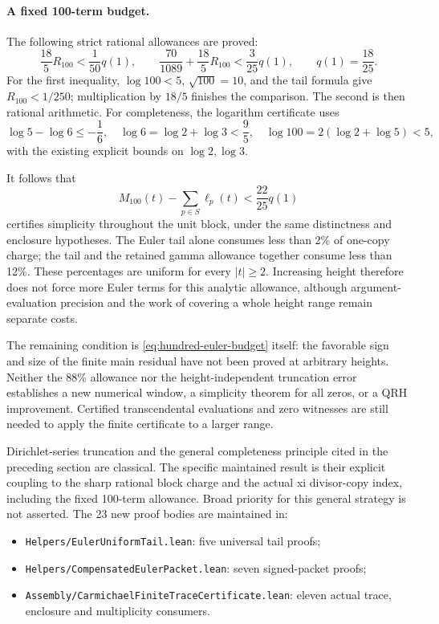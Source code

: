 \paragraph{A fixed 100-term budget.}
The following strict rational allowances are proved:
\[
 \frac{18}{5}R_{100}<\frac1{50}q(1),\qquad
 \frac{70}{1089}+\frac{18}{5}R_{100}<\frac3{25}q(1),
 \qquad q(1)=\frac{18}{25}.
\]
For the first inequality, \(\log100<5\), \(\sqrt{100}=10\), and the
tail formula give \(R_{100}<1/250\); multiplication by \(18/5\)
finishes the comparison.  The second is then rational arithmetic.
For completeness, the logarithm certificate uses
\[
 \log5-\log6\le-\frac16,\quad
 \log6=\log2+\log3<\frac95,\quad
 \log100=2(\log2+\log5)<5,
\]
with the existing explicit bounds on \(\log2,\log3\).

It follows that
\begin{equation}
 M_{100}(t)-\sum_{p\in S}\ell_p(t)
    <\frac{22}{25}q(1)
 \label{eq:hundred-euler-budget}
\end{equation}
certifies simplicity throughout the unit block, under the same distinctness
and enclosure hypotheses.  The Euler tail alone consumes less than 2\%
of one-copy charge; the tail and the retained gamma allowance together
consume less than 12\%.  These percentages are uniform for every
\(|t|\ge2\).  Increasing height therefore does not force more Euler terms
for this analytic allowance, although argument-evaluation precision and
the work of covering a whole height range remain separate costs.

The remaining condition is \eqref{eq:hundred-euler-budget} itself:
the favorable sign and size of the finite main residual have not been
proved at arbitrary heights.  Neither the 88\% allowance nor the
height-independent truncation error establishes a new numerical window,
a simplicity theorem for all zeros, or a QRH improvement.  Certified
transcendental evaluations and zero witnesses are still needed to apply
the finite certificate to a larger range.

Dirichlet-series truncation and the general completeness principle cited
in the preceding section are classical.  The specific maintained result
is their explicit coupling to the sharp rational block charge and the
actual xi divisor-copy index, including the fixed 100-term allowance.
Broad priority for this general strategy is not asserted.
The 23 new proof bodies are maintained in:
\begin{itemize}
\item \texttt{Helpers/EulerUniformTail.lean}: five universal tail proofs;
\item \texttt{Helpers/CompensatedEulerPacket.lean}: seven signed-packet proofs;
\item \texttt{Assembly/CarmichaelFiniteTraceCertificate.lean}: eleven actual
trace, enclosure and multiplicity consumers.
\end{itemize}

